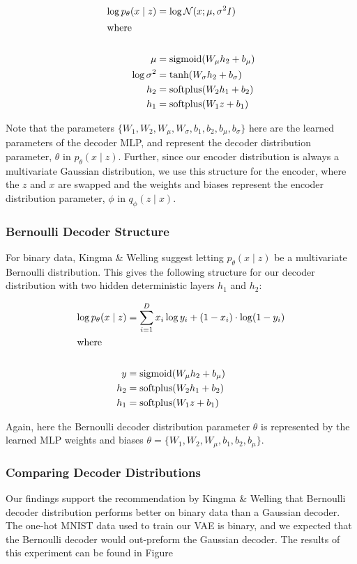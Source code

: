 \documentclass{article} %
\begin{document}
\begin{align*}
    \log p_\theta(x\mid z) &= \log \mathcal{N}(x; \mu, \sigma^2 I)\\
    \intertext{where}\\
    \mu &= \text{sigmoid}(W_\mu h_2 + b_\mu)\\
    \log \sigma^2 &= \text{tanh}(W_\sigma h_2+ b_\sigma)\\
    h_2 &= \text{softplus}(W_{2} h_1 + b_{2})\\
    h_1 &= \text{softplus}(W_{1} z + b_{1})
\end{align*}

Note that the parameters $\{W_1,W_2,W_\mu,W_\sigma,b_1,b_2,b_\mu,b_\sigma\}$ here are the learned parameters of the decoder MLP, and represent the decoder distribution parameter, $\theta$ in $p_\theta(x\mid z)$. Further, since our encoder distribution is always a multivariate Gaussian distribution, we use this structure for the encoder, where the $z$ and $x$ are swapped and the weights and biases represent the encoder distribution parameter, $\phi$ in ${q_\phi(z \mid x)}$.\\

\subsubsection{Bernoulli Decoder Structure}
For binary data, Kingma \& Welling suggest letting ${p_\theta(x\mid z)}$ be a multivariate Bernoulli distribution. This gives the following structure for our decoder distribution with two hidden deterministic layers $h_1$ and $h_2$:

\begin{align*}
    \log p_\theta(x\mid z) &= \sum_{i=1}^D x_i \log y_i + (1-x_i) \cdot \log (1-y_i)\\
    \intertext{where}\\
    y&=\text{sigmoid}(W_\mu h_2 + b_\mu)\\
    h_2&= \text{softplus}(W_2 h_1 +b_2)\\
    h_1 &= \text{softplus}(W_1 z + b_1)\\
\end{align*}

Again, here the Bernoulli decoder distribution parameter $\theta$ is represented by the learned MLP weights and biases $\theta = \{W_1,W_2,W_\mu,b_1,b_2,b_\mu\}$.\\

\subsubsection{Comparing Decoder Distributions}
Our findings support the recommendation by Kingma \& Welling that Bernoulli decoder distribution performs better on binary data than a Gaussian decoder. The one-hot MNIST data used to train our VAE is binary, and we expected that the Bernoulli decoder would out-preform the Gaussian decoder. The results of this experiment can be found in Figure %
\end{document}
